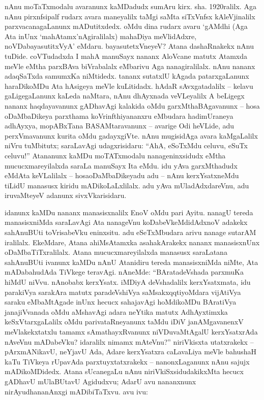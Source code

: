 nAnu moTaTxmodalu avaranunx kaMDadudx sumAru kirx. sha. {\rm 1920}ralilx. Aga nAnu pirxnfsipalf rudarx avara maneyalilx taMgi saMta siTxVnfsx kAleVjinalilx parxvacanagaLanunx mADutitxdedx. oMdu dina rudarx avaru `gAMdhi (Aga Ata inUnx `mahAtamx'nAgiralilalx) mahaDiya meVlidAdxre, noVDabayasutitxVyA' eMdaru. bayasutetxVneyeV? Atana dashaRnakekx nAnu tuDide. coVTudadxda I mahA manuSayx nananx AloVcane matutx Atamxda meVle eMtha parxBAva biVrabalalx eMbarivu Aga nanagiralilalx. nAnu nananx adaqSaTxda samumxKa niMtidedx. tananx sutatxlU kAgada patarxgaLanunx haraDikoMDu Ata hAsigeya meVle kuLitidadx. hAdaR sAvxgatadalilx -- kelavu gaLigegaLanunx kaLeda naMtara, nAnu dhAyxnada veVLeyalilx A beLigegx nananx haqdayavanunx gADhavAgi kalakida oMdu garxMthaBAgavanunx -- hosa oDaMbaDikeya parxthama koVrinfthiyananxru eMbudara hadimUraneya adhAyxya, mopABxTana BASAMtaravanunx -- avarige Odi heVLide, adu perxVmavanunx kurita oMdu gadayxgiVte. nAnu mugisidAga avara kaMgaLalilx niVru tuMbitutx; saraLavAgi udagxrisidaru: ``AhA, eSoTxMdu celuvu, eSuTx celuvu!'' Atananunx kaMDu moTATxmodalu nanageninxsidudx eMtha mucucxmareyilalxda saraLa manuSayx Ita eMdu. idu yAva garxMthadudx eMdAta keVLalilalx -- hosaoDaMbaDikeyadu adu -- nAnu kerxYsatxneMdu tiLidU manasusx kiridu mADikoLaLxlilalx. adu yAva mUladAdxdareVnu, adu iruvaMteyeV adanunx sivxVkarisidaru.

idanunx kaMDu nananx manasisxnalilx EnoV oMdu pari Ayitu. nanagU tereda manasisxniMda saraLavAgi Ata nanageVnu koDabeVkeMdidAdxnoV adakekx sahAnuBUti toVrisabeVku eninxsitu. adu eSeTxMbudara arivu nanage sutarAM iralilalx. EkeMdare, Atana ahiMsAtamxka asahakArakekx nananx manasisxnUnx oDaMbaTiTxralilalx. Atana mucucxmareyilalxda manasusx saraLatana sahAnuBUti ivanunx kaMDu nAnU Atanidiru tereda manasisxniMda niMte, Ata mADabahudAda TiVkege teravAgi. nAneMde: ``BAratadeVshada parxmuKa hiMdU niVvu. nAnobabx kerxYsatx. iMDiyA deVshadalilx kerxYsatxmata, idu parakiVya sarakAra matutx paradeVshiVya saMsakxqqtiyoMdara vijAtiVya saraku eMbaMtAgade inUnx hecucx sahajavAgi hoMdikoMDu BAratiVya janajiVvanada oMdu aMshavAgi adara neYtika matutx AdhAyxtimxka keSxVtarxgaLalilx oMdu parivataRneyanunx taMdu iDiV janAMgavanenxV meVlakekxtatxlu tamamx sAmathayxRvanunx niVDuvaMtAgalU kerxYsatxrAda nAveVnu mADabeVku? idaralilx nimamx mAteVnu?'' niriVkisxta utatxrakekx -- pArxmANikavU, neYjavU Ada, Adare kerxYsatxra caLavaLiya meVle bahushaH kaTu TiVkeya rUpavAda parxtuyxtatxrakekx -- nanonxLaganunx nAnu sajujx mADikoMDidedx. Atana sUcanegaLu nAnu niriVkiSxsidudakikxMta hecucx gADhavU mUlaBUtavU Agidudxvu; AdarU avu nananxnunx nirAyudhananAnxgi mADibiTaTxvu. avu ivu:


